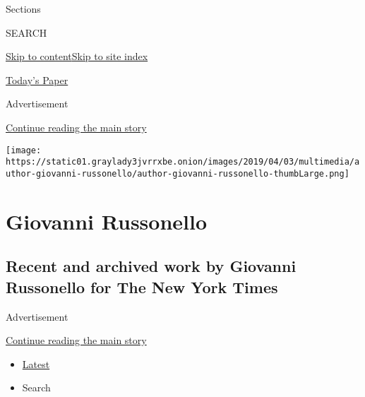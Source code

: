 Sections

SEARCH

\protect\hyperlink{site-content}{Skip to
content}\protect\hyperlink{site-index}{Skip to site index}

\href{https://myaccount.nytimes3xbfgragh.onion/auth/login?response_type=cookie\&client_id=vi}{}

\href{https://www.nytimes3xbfgragh.onion/section/todayspaper}{Today's
Paper}

Advertisement

\protect\hyperlink{after-top}{Continue reading the main story}

\texttt{[image: https://static01.graylady3jvrrxbe.onion/images/2019/04/03/multimedia/author-giovanni-russonello/author-giovanni-russonello-thumbLarge.png]}

\hypertarget{giovanni-russonello}{%
\section{Giovanni Russonello}\label{giovanni-russonello}}

\hypertarget{recent-and-archived-work-by-giovanni-russonello-for-the-new-york-times}{%
\subsection{Recent and archived work by Giovanni Russonello for The New
York
Times}\label{recent-and-archived-work-by-giovanni-russonello-for-the-new-york-times}}

Advertisement

\protect\hyperlink{after-mid1}{Continue reading the main story}

\begin{itemize}
\tightlist
\item
  \protect\hyperlink{stream-panel}{Latest}
\item
  Search
\end{itemize}

